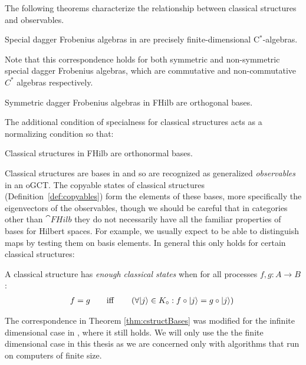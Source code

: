 The following theorems characterize the relationship between classical structures and observables. 

\begin{theorem}
Special dagger Frobenius algebras in  are precisely finite-dimensional C$^*$-algebras.
\end{theorem}
\noindent Note that this correspondence holds for both symmetric and non-symmetric special dagger Frobenius algebras, which are commutative and non-commutative $C^*$ algebras respectively.

\begin{theorem}
Symmetric dagger Frobenius algebras in FHilb are orthogonal bases.
\end{theorem}
\noindent The additional condition of specialness for classical structures acts as a normalizing condition so that:
\begin{theorem}
\label{thm:cstructBases}
Classical structures in FHilb are orthonormal bases.
\end{theorem}

\noindent \noindent Classical structures are bases in  and so are recognized as generalized \emph{observables} in an oGCT. The copyable states of classical structures  (Definition~\ref{def:copyables}) form the elements of these bases, more specifically the eigenvectors of the observables, though we should be careful that in categories other than $\cat{FHilb}$ they do not necessarily have all the familiar properties of bases for Hilbert spaces.  For example, we usually expect to be able to distinguish maps by testing them on basis elements. In general this only holds for certain classical structures:

\begin{defn}
\label{def:enoughclassicalpoints}
A classical structure has \emph{enough classical states} when for all processes $f,g:A\to B$: 
\begin{align}
f=g \qquad \mbox{iff}\qquad \left(\forall | j \rangle\in K_{\circ}:f\circ| j \rangle=g\circ| j \rangle\right)\; 
\end{align}
\end{defn}

\begin{remark}
The correspondence in Theorem \ref{thm:cstructBases} was modified for the infinite dimensional case in \cite{abramsky2012h}, where it still holds. We will only use the the finite dimensional case in this thesis as we are concerned only with algorithms that run on computers of finite size.
\end{remark}


